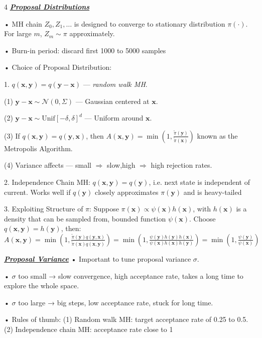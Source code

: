 \documentclass[10pt]{article}
\newcommand{\bulletPoint}[1]{\ul{\textit{\textbf{#1}}}}
\begin{document}
\begin{multicols*}{4}
\bulletPoint{Proposal Distributions}\quad

• MH chain $Z_0, Z_1, \dots$ is designed to converge to stationary distribution $\pi(\cdot)$.   
For large $m$, $Z_m \sim \pi$ approximately.   

• Burn-in period: discard first 1000 to 5000 samples

• Choice of Proposal Distribution:

1. $q(\mathbf{x}, \mathbf{y}) = q(\mathbf{y} - \mathbf{x})$ — \textit{random walk MH}.   

(1) $\mathbf{y} - \mathbf{x} \sim \mathcal{N}(0, \Sigma)$ — Gaussian centered at $\mathbf{x}$. \quad  

(2) $\mathbf{y} - \mathbf{x} \sim \text{Unif}[-\delta, \delta]^d$ — Uniform around $\mathbf{x}$.   \quad

(3) If $q(\mathbf{x}, \mathbf{y}) = q(\mathbf{y}, \mathbf{x})$, then  
$A(\mathbf{x}, \mathbf{y}) = \min\left(1, \frac{\tilde{\pi}(\mathbf{y})}{\tilde{\pi}(\mathbf{x})}\right)$  known as the Metropolis Algorithm. 

(4) Variance affects — small $\Rightarrow$ slow,\quad high $\Rightarrow$ high rejection rates.

2. Independence Chain MH: 
$q(\mathbf{x}, \mathbf{y}) = q(\mathbf{y})$, i.e. next state is independent of current. \quad  
Works well if $q(\mathbf{y})$ closely approximates $\pi(\mathbf{y})$ and is heavy-tailed

3. Exploiting Structure of $\pi$: 
Suppose $\pi(\mathbf{x}) \propto \psi(\mathbf{x}) h(\mathbf{x})$, with $h(\mathbf{x})$ is a density
that can be sampled from, bounded function $\psi(\mathbf{x})$. \quad  
Choose $q(\mathbf{x}, \mathbf{y}) = h(\mathbf{y})$, then:
$A(\mathbf{x}, \mathbf{y}) = \min\left(1, \frac{\tilde{\pi}(\mathbf{y})q(\mathbf{y}, \mathbf{x})}{\tilde{\pi}(\mathbf{x})q(\mathbf{x}, \mathbf{y})} \right)
= \min\left(1, \frac{\psi(\mathbf{y})h(\mathbf{y})h(\mathbf{x})}{\psi(\mathbf{x})h(\mathbf{x})h(\mathbf{y})} \right)
= \min\left(1, \frac{\psi(\mathbf{y})}{\psi(\mathbf{x})} \right)$


\bulletPoint{Proposal Variance} \quad
• Important to tune proposal variance $\sigma$. \quad

• $\sigma$ too small → slow convergence, high acceptance rate, takes a long time to explore the whole space. 

• $\sigma$ too large → big steps, low acceptance rate, stuck for long time. 

• Rules of thumb:
(1) Random walk MH: target acceptance rate of 0.25 to 0.5. 
(2) Independence chain MH: acceptance rate close to 1


\end{multicols*}
\end{document}
